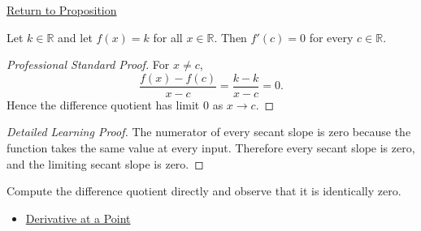 \newpage
{}
\label{prf:derivative-of-a-constant}

\begin{remark*}[Return]
\hyperref[prop:derivative-of-a-constant]{Return to Proposition}
\end{remark*}

\begin{proposition*}
Let $k\in\mathbb{R}$ and let $f(x)=k$ for all $x\in\mathbb{R}$. Then $f'(c)=0$ for every $c\in\mathbb{R}$.
\end{proposition*}

\begin{proof}[Professional Standard Proof]
\LRAProofBodyStart
For $x\neq c$,
\[
  \frac{f(x)-f(c)}{x-c}=\frac{k-k}{x-c}=0.
\]
Hence the difference quotient has limit $0$ as $x\to c$.
\end{proof}

\begin{proof}[Detailed Learning Proof]
\LRAProofBodyStart
The numerator of every secant slope is zero because the function takes the same value at every input. Therefore every secant slope is zero, and the limiting secant slope is zero.
\end{proof}

\begin{remark*}
Compute the difference quotient directly and observe that it is identically zero.
\end{remark*}

\begin{dependencies}
\begin{itemize}
  \item \hyperref[def:derivative-at-a-point]{Derivative at a Point}
\end{itemize}
\end{dependencies}

\clearpage
